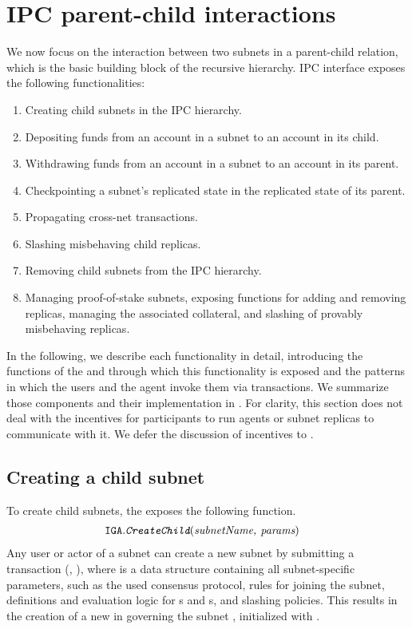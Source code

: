 \section{IPC parent-child interactions}
\label{sec:functionality}

We now focus on the interaction between two subnets in a parent-child relation, which is the basic building block of the recursive \ipc hierarchy.
IPC interface exposes the following functionalities:
\begin{enumerate}

    \item Creating child subnets in the IPC hierarchy.
    \item Depositing funds from an account in a subnet to an account in its child.
    \item Withdrawing funds from an account in a subnet to an account in its parent.
    \item Checkpointing a subnet's replicated state in the replicated state of its parent.
    \item Propagating cross-net transactions.
    \item Slashing misbehaving child replicas.
    \item Removing child subnets from the IPC hierarchy.
    \item Managing proof-of-stake subnets, exposing functions for adding and removing replicas, managing the associated collateral, and slashing of provably misbehaving replicas.
\end{enumerate}
In the following, we describe each functionality in detail, introducing the functions of the \gw and \sa through which this functionality is exposed
and the patterns in which the users and the \ipc agent invoke them via transactions.
We summarize those components and their implementation in .
For clarity, this section does not deal with the incentives for participants to run \ipc agents or subnet replicas to communicate with it.
We defer the discussion of incentives to .

\subsection{Creating a child subnet}
\label{sec:create}

To create child subnets, the \gw exposes the following function.
\begin{align*}
    \texttt{IGA}.&\textit{\texttt{CreateChild}}(\textit{subnetName, params})    
\end{align*}
Any user or actor of a subnet  can create a new subnet  by submitting a transaction (, ),
where  is a data structure containing all subnet-specific parameters,
such as the used consensus protocol, rules for joining the subnet, definitions and evaluation logic for {\pom}s and {\pof}s, and slashing policies.
This results in the creation of a new \saFull {} in  governing the subnet , initialized with .


